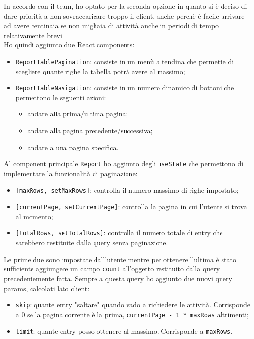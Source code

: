 In accordo con il team, ho optato per la seconda opzione in quanto si è deciso di dare priorità a non sovraccaricare troppo il client, anche perchè è facile arrivare ad avere centinaia se non migliaia di attività anche in periodi di tempo relativamente brevi. \\
Ho quindi aggiunto due React components:
\begin{itemize}
  \item \texttt{ReportTablePagination}: consiste in un menù a tendina che permette di scegliere quante righe la tabella potrà avere al massimo;
  \item \texttt{ReportTableNavigation}: consiste in un numero dinamico di bottoni che permettono le seguenti azioni:
  \begin{itemize}
    \item andare alla prima/ultima pagina;
    \item andare alla pagina precedente/successiva;
    \item andare a una pagina specifica.
  \end{itemize}
\end{itemize}

Al component principale \texttt{Report} ho aggiunto degli \texttt{useState} che permettono di implementare la funzionalità di paginazione:
\begin{itemize}
  \item \texttt{[maxRows, setMaxRows]}: controlla il numero massimo di righe impostato;
  \item \texttt{[currentPage, setCurrentPage]}: controlla la pagina in cui l'utente si trova al momento;
  \item \texttt{[totalRows, setTotalRows]}: controlla il numero totale di entry che sarebbero restituite dalla query senza paginazione.
\end{itemize}
Le prime due sono impostate dall'utente mentre per ottenere l'ultima è stato sufficiente aggiungere un campo \texttt{count} all'oggetto restituito dalla query precedentemente fatta. Sempre a questa query ho aggiunto due nuovi query params, calcolati lato client:
\begin{itemize}
  \item \texttt{skip}: quante entry "saltare" quando vado a richiedere le attività. Corrisponde a 0 se la pagina corrente è la prima, \texttt{currentPage - 1 * maxRows} altrimenti;
  \item \texttt{limit}: quante entry posso ottenere al massimo. Corrisponde a \texttt{maxRows}.
\end{itemize}

